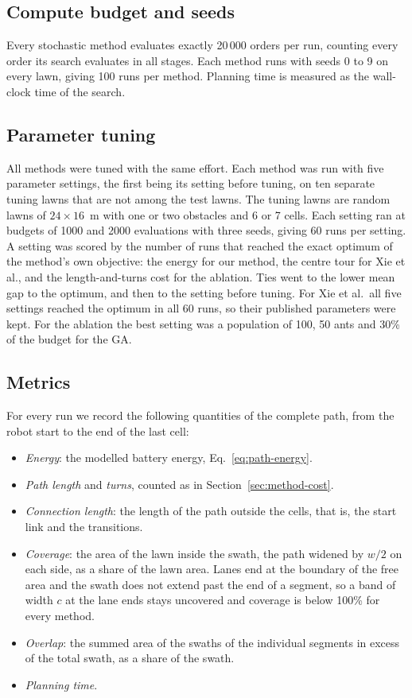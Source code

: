 \subsection{Compute budget and seeds}
\label{sec:setup-budget}

Every stochastic method evaluates exactly 20\,000 orders per run, counting every order its search evaluates in all stages.
Each method runs with seeds 0 to 9 on every lawn, giving 100 runs per method.
Planning time is measured as the wall-clock time of the search.

\subsection{Parameter tuning}
\label{sec:setup-tuning}

All methods were tuned with the same effort.
Each method was run with five parameter settings, the first being its setting before tuning, on ten separate tuning lawns that are not among the test lawns.
The tuning lawns are random lawns of $24 \times 16$~m with one or two obstacles and 6 or 7 cells.
Each setting ran at budgets of 1000 and 2000 evaluations with three seeds, giving 60 runs per setting.
A setting was scored by the number of runs that reached the exact optimum of the method's own objective: the energy for our method, the centre tour for Xie et al., and the length-and-turns cost for the ablation.
Ties went to the lower mean gap to the optimum, and then to the setting before tuning.
For Xie et al.\ all five settings reached the optimum in all 60 runs, so their published parameters were kept.
For the ablation the best setting was a population of 100, 50 ants and 30\% of the budget for the GA.

\subsection{Metrics}
\label{sec:setup-metrics}

For every run we record the following quantities of the complete path, from the robot start to the end of the last cell:
\begin{itemize}
\item \emph{Energy}: the modelled battery energy, Eq.~\eqref{eq:path-energy}.
\item \emph{Path length} and \emph{turns}, counted as in Section~\ref{sec:method-cost}.
\item \emph{Connection length}: the length of the path outside the cells, that is, the start link and the transitions.
\item \emph{Coverage}: the area of the lawn inside the swath, the path widened by $w/2$ on each side, as a share of the lawn area. Lanes end at the boundary of the free area and the swath does not extend past the end of a segment, so a band of width $c$ at the lane ends stays uncovered and coverage is below 100\% for every method.
\item \emph{Overlap}: the summed area of the swaths of the individual segments in excess of the total swath, as a share of the swath.
\item \emph{Planning time}.
\end{itemize}

